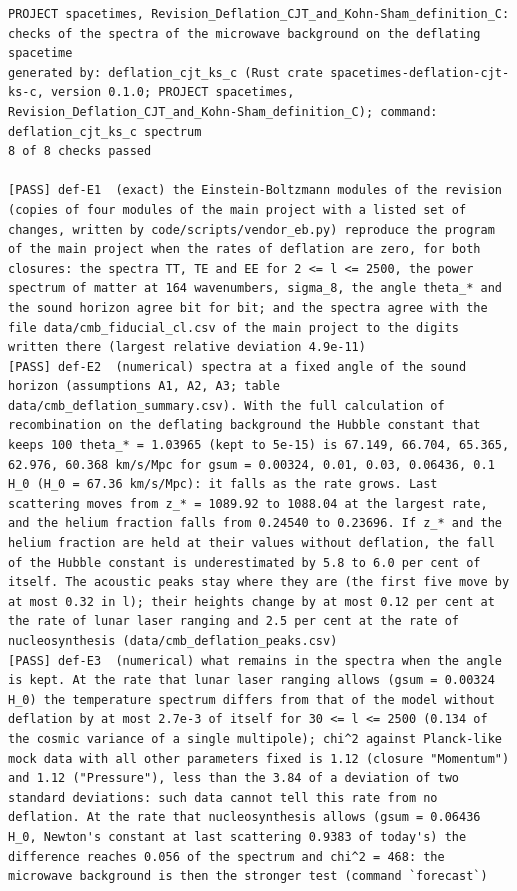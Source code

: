 \documentclass[
  10pt,
]{article}
\begin{document}
\begin{verbatim}
PROJECT spacetimes, Revision_Deflation_CJT_and_Kohn-Sham_definition_C: checks of the spectra of the microwave background on the deflating spacetime
generated by: deflation_cjt_ks_c (Rust crate spacetimes-deflation-cjt-ks-c, version 0.1.0; PROJECT spacetimes, Revision_Deflation_CJT_and_Kohn-Sham_definition_C); command: deflation_cjt_ks_c spectrum
8 of 8 checks passed

[PASS] def-E1  (exact) the Einstein-Boltzmann modules of the revision (copies of four modules of the main project with a listed set of changes, written by code/scripts/vendor_eb.py) reproduce the program of the main project when the rates of deflation are zero, for both closures: the spectra TT, TE and EE for 2 <= l <= 2500, the power spectrum of matter at 164 wavenumbers, sigma_8, the angle theta_* and the sound horizon agree bit for bit; and the spectra agree with the file data/cmb_fiducial_cl.csv of the main project to the digits written there (largest relative deviation 4.9e-11)
[PASS] def-E2  (numerical) spectra at a fixed angle of the sound horizon (assumptions A1, A2, A3; table data/cmb_deflation_summary.csv). With the full calculation of recombination on the deflating background the Hubble constant that keeps 100 theta_* = 1.03965 (kept to 5e-15) is 67.149, 66.704, 65.365, 62.976, 60.368 km/s/Mpc for gsum = 0.00324, 0.01, 0.03, 0.06436, 0.1 H_0 (H_0 = 67.36 km/s/Mpc): it falls as the rate grows. Last scattering moves from z_* = 1089.92 to 1088.04 at the largest rate, and the helium fraction falls from 0.24540 to 0.23696. If z_* and the helium fraction are held at their values without deflation, the fall of the Hubble constant is underestimated by 5.8 to 6.0 per cent of itself. The acoustic peaks stay where they are (the first five move by at most 0.32 in l); their heights change by at most 0.12 per cent at the rate of lunar laser ranging and 2.5 per cent at the rate of nucleosynthesis (data/cmb_deflation_peaks.csv)
[PASS] def-E3  (numerical) what remains in the spectra when the angle is kept. At the rate that lunar laser ranging allows (gsum = 0.00324 H_0) the temperature spectrum differs from that of the model without deflation by at most 2.7e-3 of itself for 30 <= l <= 2500 (0.134 of the cosmic variance of a single multipole); chi^2 against Planck-like mock data with all other parameters fixed is 1.12 (closure "Momentum") and 1.12 ("Pressure"), less than the 3.84 of a deviation of two standard deviations: such data cannot tell this rate from no deflation. At the rate that nucleosynthesis allows (gsum = 0.06436 H_0, Newton's constant at last scattering 0.9383 of today's) the difference reaches 0.056 of the spectrum and chi^2 = 468: the microwave background is then the stronger test (command `forecast`)

\end{verbatim}
\end{document}
